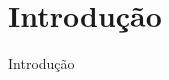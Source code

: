 \section{Introdução}
\label{s.introduction}

\begin{frame}{Introdução}
\end{frame}

\begin{frame}
\end{frame}